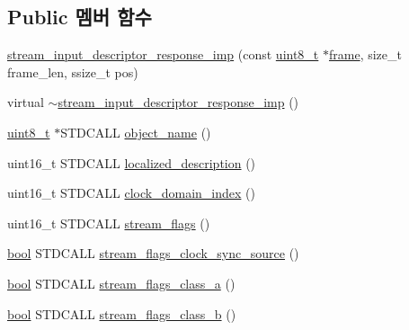 \subsection*{Public 멤버 함수}
\begin{DoxyCompactItemize}
\item 
\hyperlink{classavdecc__lib_1_1stream__input__descriptor__response__imp_a1aa41f6a910980b48d385ed71be3f692}{stream\+\_\+input\+\_\+descriptor\+\_\+response\+\_\+imp} (const \hyperlink{stdint_8h_aba7bc1797add20fe3efdf37ced1182c5}{uint8\+\_\+t} $\ast$\hyperlink{gst__avb__playbin_8c_ac8e710e0b5e994c0545d75d69868c6f0}{frame}, size\+\_\+t frame\+\_\+len, ssize\+\_\+t pos)
\item 
virtual \hyperlink{classavdecc__lib_1_1stream__input__descriptor__response__imp_a8994fdd81c61c174913524a058c6c817}{$\sim$stream\+\_\+input\+\_\+descriptor\+\_\+response\+\_\+imp} ()
\item 
\hyperlink{stdint_8h_aba7bc1797add20fe3efdf37ced1182c5}{uint8\+\_\+t} $\ast$S\+T\+D\+C\+A\+LL \hyperlink{classavdecc__lib_1_1stream__input__descriptor__response__imp_a15837e3eb254ad44812cb766ae8cd53c}{object\+\_\+name} ()
\item 
uint16\+\_\+t S\+T\+D\+C\+A\+LL \hyperlink{classavdecc__lib_1_1stream__input__descriptor__response__imp_aa94307532fbb37e2f986fee8fec79373}{localized\+\_\+description} ()
\item 
uint16\+\_\+t S\+T\+D\+C\+A\+LL \hyperlink{classavdecc__lib_1_1stream__input__descriptor__response__imp_a25f4f17a510b3f05e97806cd40751774}{clock\+\_\+domain\+\_\+index} ()
\item 
uint16\+\_\+t S\+T\+D\+C\+A\+LL \hyperlink{classavdecc__lib_1_1stream__input__descriptor__response__imp_ae2c7ef21d6748f8c665984ab3328f75f}{stream\+\_\+flags} ()
\item 
\hyperlink{avb__gptp_8h_af6a258d8f3ee5206d682d799316314b1}{bool} S\+T\+D\+C\+A\+LL \hyperlink{classavdecc__lib_1_1stream__input__descriptor__response__imp_af9491e9352fca611fcb8e87f5cedc33b}{stream\+\_\+flags\+\_\+clock\+\_\+sync\+\_\+source} ()
\item 
\hyperlink{avb__gptp_8h_af6a258d8f3ee5206d682d799316314b1}{bool} S\+T\+D\+C\+A\+LL \hyperlink{classavdecc__lib_1_1stream__input__descriptor__response__imp_a1649becad8758c57728299dd945d1e8b}{stream\+\_\+flags\+\_\+class\+\_\+a} ()
\item 
\hyperlink{avb__gptp_8h_af6a258d8f3ee5206d682d799316314b1}{bool} S\+T\+D\+C\+A\+LL \hyperlink{classavdecc__lib_1_1stream__input__descriptor__response__imp_a1a27dcf14ebf83cc16b3cb8660b18ee4}{stream\+\_\+flags\+\_\+class\+\_\+b} ()

\end{DoxyCompactItemize}
